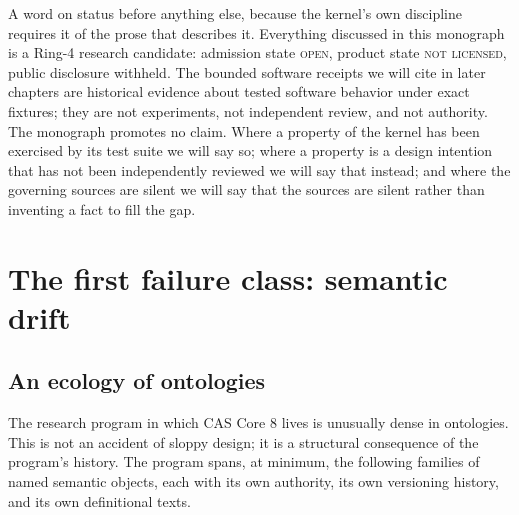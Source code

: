 A word on status before anything else, because the kernel's own discipline
requires it of the prose that describes it. Everything discussed in this
monograph is a Ring-4 research candidate: admission state \textsc{open},
product state \textsc{not licensed}, public disclosure withheld. The bounded
software receipts we will cite in later chapters are historical evidence
about tested software behavior under exact fixtures; they are not
experiments, not independent review, and not authority. The monograph
promotes no claim. Where a property of the kernel has been exercised by its
test suite we will say so; where a property is a design intention that has
not been independently reviewed we will say that instead; and where the
governing sources are silent we will say that the sources are silent rather
than inventing a fact to fill the gap.

\section{The first failure class: semantic drift}\label{ch01:drift}

\subsection{An ecology of ontologies}\label{ch01:ecology}

The research program in which CAS Core 8 lives is unusually dense in
ontologies. This is not an accident of sloppy design; it is a structural
consequence of the program's history. The program spans, at minimum, the
following families of named semantic objects, each with its own authority,
its own versioning history, and its own definitional texts.

